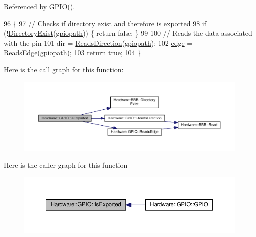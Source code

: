 Referenced by G\+P\+I\+O().


\begin{DoxyCode}
96     \{
97         \textcolor{comment}{// Checks if directory exist and therefore is exported}
98         \textcolor{keywordflow}{if} (!\hyperlink{class_hardware_1_1_b_b_b_adf431d8e0e8899f7aa16c350a2270e79}{DirectoryExist}(\hyperlink{class_hardware_1_1_g_p_i_o_ac47062ed6aba52b9e8506e1575bf5061}{gpiopath})) \{ \textcolor{keywordflow}{return} \textcolor{keyword}{false}; \}
99 
100         \textcolor{comment}{// Reads the data associated with the pin}
101         dir = \hyperlink{class_hardware_1_1_g_p_i_o_a875d4f95ff3e6a70196660faa0477cf5}{ReadsDirection}(\hyperlink{class_hardware_1_1_g_p_i_o_ac47062ed6aba52b9e8506e1575bf5061}{gpiopath});
102         \hyperlink{class_hardware_1_1_g_p_i_o_adf15f74f053069029e99934e28c109e0}{edge} = \hyperlink{class_hardware_1_1_g_p_i_o_ac5a3c6d1a0ce58a0b2ee0752623810e4}{ReadsEdge}(\hyperlink{class_hardware_1_1_g_p_i_o_ac47062ed6aba52b9e8506e1575bf5061}{gpiopath});
103         \textcolor{keywordflow}{return} \textcolor{keyword}{true};
104     \}
\end{DoxyCode}


Here is the call graph for this function\+:\nopagebreak
\begin{figure}[H]
\begin{center}
\leavevmode
\includegraphics[width=350pt]{class_hardware_1_1_g_p_i_o_a423f9ac92259cacdca0c82c3ee9b1cdd_cgraph}
\end{center}
\end{figure}




Here is the caller graph for this function\+:\nopagebreak
\begin{figure}[H]
\begin{center}
\leavevmode
\includegraphics[width=350pt]{class_hardware_1_1_g_p_i_o_a423f9ac92259cacdca0c82c3ee9b1cdd_icgraph}
\end{center}
\end{figure}


